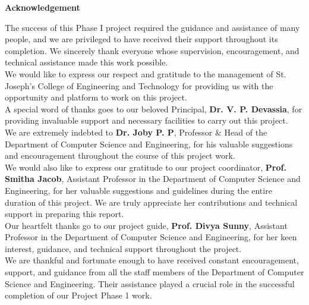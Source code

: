\newpage
\thispagestyle{empty}

\begin{center}

  \vspace*{1cm}
  \textbf{\large Acknowledgement}
\end{center}


The success of this Phase I project required the guidance and assistance of many people, and we are privileged to have received their support throughout its completion. We sincerely thank everyone whose supervision, encouragement, and technical assistance made this work possible.\vspace{0.2cm}
\\We would like to express our respect and gratitude to the management of St. Joseph's College of Engineering and Technology for providing us with the opportunity and platform to work on this project.\vspace{0.2cm}
\\A special word of thanks goes to our beloved Principal, {\bf Dr. V. P. Devassia}, for providing invaluable support and necessary facilities to carry out this project.\vspace{0.2cm}
\\We are extremely indebted to \textbf{Dr. Joby P. P}, Professor \& Head of the Department of Computer Science and Engineering, for his valuable suggestions and encouragement throughout the course of this project work.\vspace{0.2cm}
\\We would also like to express our gratitude to our project coordinator, \textbf{Prof. Smitha Jacob}, Assistant Professor in the Department of Computer Science and Engineering, for her valuable suggestions and guidelines during the entire duration of this project. We are truly appreciate her contributions and technical support in preparing this report.\vspace{0.2cm}
\\Our heartfelt thanks go to our project guide, \textbf{Prof. Divya Sunny}, Assistant Professor in the Department of Computer Science and Engineering, for her keen interest, guidance, and technical support throughout the project.\vspace{0.2cm}
\\We are thankful and fortunate enough to have received constant encouragement, support, and guidance from all the staff members of the Department of Computer Science and Engineering. Their assistance played a crucial role in the successful completion of our Project Phase 1 work.
